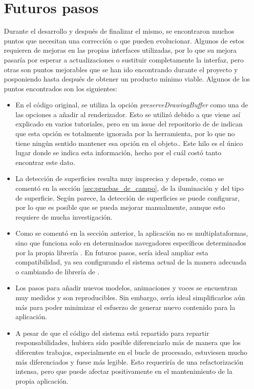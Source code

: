 \documentclass{subfiles}
\begin{document}
    \section{Futuros pasos}
    \label{sec:futuros_pasos}
    Durante el desarrollo y después de finalizar el mismo, se encontraron muchos puntos que necesitan una corrección o que pueden evolucionar. Algunos de estos requieren de mejoras en las propias interfaces utilizadas, por lo que su mejora pasaría por esperar a actualizaciones o sustituir completamente la interfaz, pero otras son puntos mejorables que se han ido encontrando durante el proyecto y posponiendo hasta después de obtener un producto mínimo viable. Algunos de los puntos encontrados son los siguientes:
    \begin{itemize}
        \item En el código original, se utiliza la opción \textit{preserveDrawingBuffer} como una de las opciones a añadir al renderizador. Esto se utilizó debido a que viene así explicado en varios tutoriales, pero en un issue del repositorio de \github de \webxr indican que esta opción es totalmente ignorada por la herramienta, por lo que no tiene ningún sentido mantener esa opción en el objeto.\cite{web:webxr_github_preserveDrawingBuffer}. Este hilo es el único lugar donde se indica esta información, hecho por el cuál costó tanto encontrar este dato.
        \item La detección de superficies resulta muy imprecisa y depende, como se comentó en la sección \ref{sec:pruebas_de_campo}, de la iluminación y del tipo de superficie. Según parece, la detección de superficies se puede configurar, por lo que es posible que se pueda mejorar manualmente, aunque esto requiere de mucha investigación.
        \item Como se comentó en la sección anterior, la aplicación no es multiplataformas, sino que funciona solo en determinados navegadores específicos determinados por la propia librería \webxr. En futuros pasos, sería ideal ampliar esta compatibilidad, ya sea configurando el sistema actual de la manera adecuada o cambiando de librería de \ra.
        \item Los pasos para añadir nuevos modelos, animaciones y voces se encuentran muy medidos y son reproducibles. Sin embargo, sería ideal simplificarlos aún más para poder minimizar el esfuerzo de generar nuevo contenido para la aplicación.
        \item A pesar de que el código del sistema está repartido para repartir responsabilidades, hubiera sido posible diferenciarlo más de manera que los diferentes trabajos, especialmente en el bucle de procesado, estuviesen mucho más diferenciados y fuese más legible. Esto requeriría de una refactorización intensa, pero que puede afectar positivamente en el mantenimiento de la propia aplicación.

\end{itemize}
\end{document}
